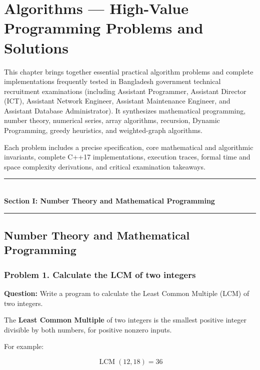 \chapter{Algorithms --- High-Value Programming Problems and Solutions}
\label{ch:algorithms_problems}

This chapter brings together essential practical algorithm problems and complete implementations frequently tested in Bangladesh government technical recruitment examinations (including Assistant Programmer, Assistant Director (ICT), Assistant Network Engineer, Assistant Maintenance Engineer, and Assistant Database Administrator). It synthesizes mathematical programming, number theory, numerical series, array algorithms, recursion, Dynamic Programming, greedy heuristics, and weighted-graph algorithms.

Each problem includes a precise specification, core mathematical and algorithmic invariants, complete C++17 implementations, execution traces, formal time and space complexity derivations, and critical examination takeaways.


\begin{center}
\vspace{0.5em}
{\color{primary}\rule{0.45\textwidth}{1.2pt}}\\[4pt]
{\Large\bfseries\color{primary} Section I: Number Theory and Mathematical Programming}\\[2pt]
{\color{primary}\rule{0.45\textwidth}{1.2pt}}
\vspace{0.5em}
\end{center}

\section{Number Theory and Mathematical Programming}


\subsection{Problem 1. Calculate the LCM of two integers}

\textbf{Question:} Write a program to calculate the Least Common Multiple (LCM) of two integers.

The \textbf{Least Common Multiple} of two integers is the smallest positive integer divisible by both numbers, for positive nonzero inputs.

For example:


\[
\operatorname{LCM}(12,18)=36
\]


